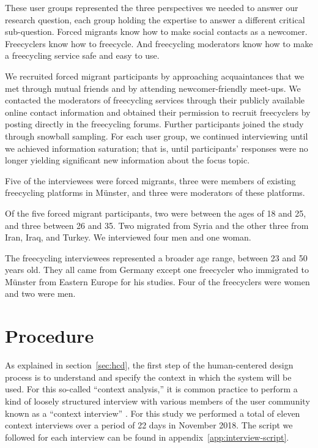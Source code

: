 These user groups represented the three perspectives we needed to answer our research question, each group holding the expertise to answer a different critical sub-question. Forced migrants know how to make social contacts as a newcomer. Freecyclers know how to freecycle. And freecycling moderators know how to make a freecycling service safe and easy to use.

We recruited forced migrant participants by approaching acquaintances that we met through mutual friends and by attending newcomer-friendly meet-ups. We contacted the moderators of freecycling services through their publicly available online contact information and obtained their permission to recruit freecyclers by posting directly in the freecycling forums. Further participants joined the study through snowball sampling. For each user group, we continued interviewing until we achieved information saturation; that is, until participants' responses were no longer yielding significant new information about the focus topic.

Five of the interviewees were forced migrants, three were members of existing freecycling platforms in Münster, and three were moderators of these platforms.

Of the five forced migrant participants, two were between the ages of 18 and 25, and three between 26 and 35. Two migrated from Syria and the other three from Iran, Iraq, and Turkey. We interviewed four men and one woman.

The freecycling interviewees represented a broader age range, between 23 and 50 years old. They all came from Germany except one freecycler who immigrated to Münster from Eastern Europe for his studies. Four of the freecyclers were women and two were men.


\section{Procedure}

As explained in section~\ref{sec:hcd}, the first step of the human-centered design process is to understand and specify the context in which the system will be used. For this so-called ``context analysis,'' it is common practice to perform a kind of loosely structured interview with various members of the user community known as a ``context interview'' \cite{riedemann_context_2018}. For this study we performed a total of eleven context interviews over a period of 22 days in November 2018. The script we followed for each interview can be found in appendix~\ref{app:interview-script}.

